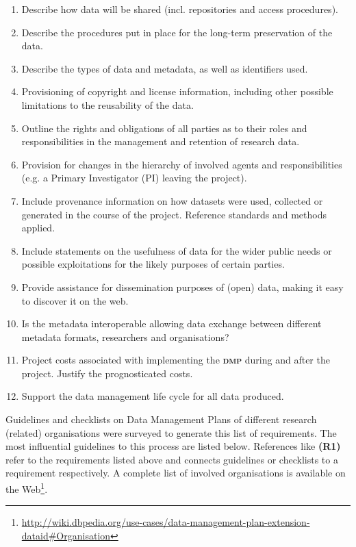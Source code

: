 \documentclass[a4paper,english,twoside,BCOR1.5cm,headsepline,DIV12,appendixprefix,final,12pt]{scrbook}
\newcommand{\dmp}{{\scshape\bfseries dmp}\xspace}
\newcommand\footnoteurl[1]{\footnote{\scriptsize\url{#1}}}
\begin{document}
\begin{enumerate}
\item Describe how data will be shared (incl. repositories and access procedures). %
\item Describe the procedures put in place for the long-term preservation of the data.
\item Describe the types of data and metadata, as well as identifiers used.
\item Provisioning of copyright and license information, including other possible limitations to the reusability of the data.
\item Outline the rights and obligations of all parties as to their roles and responsibilities in the management and retention of research data.
\item Provision for changes in the hierarchy of involved agents and responsibilities (e.g. a Primary Investigator (PI) leaving the project).
\item Include provenance information on how datasets were used, collected or generated in the course of the project. Reference standards and methods applied.
\item Include statements on the usefulness of data for the wider public needs or possible exploitations for the likely purposes of certain parties.
\item Provide assistance for dissemination purposes of (open) data, making it easy to discover it on the web.
\item Is the metadata interoperable allowing data exchange between different metadata formats, researchers and organisations?
\item Project costs associated with implementing the \dmp during and after the project. Justify the prognosticated costs.
\item Support the data management life cycle for all data produced.
\end{enumerate}

Guidelines and checklists on Data Management Plans of different research (related) organisations were surveyed to generate this list of requirements. The most influential guidelines to this process are listed below. References like \textbf{(R1)} refer to the requirements listed above and connects guidelines or checklists to a requirement respectively. A complete list of involved organisations is available on the Web\footnoteurl{http://wiki.dbpedia.org/use-cases/data-management-plan-extension-dataid\#Organisation}.
\end{document}
